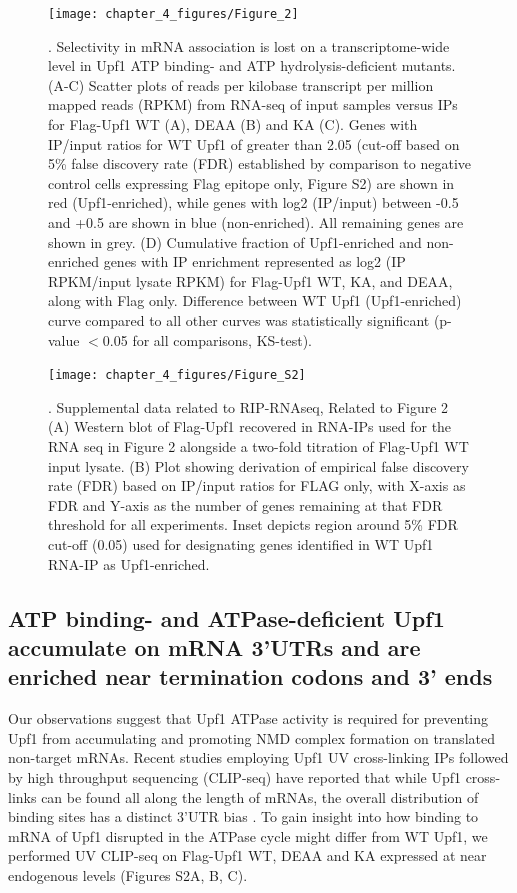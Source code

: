 \begin{figure}[ht]
  \centering
  \texttt{[image: chapter\_4\_figures/Figure\_2]}
  \caption[Figure 1]{. Selectivity in mRNA association is lost on a transcriptome-wide level in Upf1 ATP binding- and ATP hydrolysis-deficient mutants.
    (A-C) Scatter plots of reads per kilobase transcript per million mapped reads (RPKM) from RNA-seq of input samples versus IPs for Flag-Upf1 WT (A), DEAA (B) and KA (C). Genes with IP/input ratios for WT Upf1 of greater than 2.05 (cut-off based on 5\% false discovery rate (FDR) established by comparison to negative control cells expressing Flag epitope only, Figure S2) are shown in red (Upf1-enriched), while genes with log2 (IP/input) between -0.5 and +0.5 are shown in blue (non-enriched). All remaining genes are shown in grey. (D) Cumulative fraction of Upf1-enriched and non-enriched genes with IP enrichment represented as log2 (IP RPKM/input lysate RPKM) for Flag-Upf1 WT, KA, and DEAA, along with Flag only. Difference between WT Upf1 (Upf1-enriched) curve compared to all other curves was statistically significant (p-value $<$0.05 for all comparisons, KS-test). }
  \label{fig:Figure_1}
  \end{figure}

\begin{figure}[ht]
  \centering
  \texttt{[image: chapter\_4\_figures/Figure\_S2]}
  \caption[Supplementary Figure 1]{. Supplemental data related to RIP-RNAseq, Related to Figure 2
    (A) Western blot of Flag-Upf1 recovered in RNA-IPs used for the RNA seq in Figure 2 alongside a two-fold titration of Flag-Upf1 WT input lysate. (B) Plot showing derivation of empirical false discovery rate (FDR) based on IP/input ratios for FLAG only, with X-axis as FDR and Y-axis as the number of genes remaining at that FDR threshold for all experiments. Inset depicts region around 5\% FDR cut-off (0.05) used for designating genes identified in WT Upf1 RNA-IP as Upf1-enriched. }
  \label{fig:Figure_S1}
\end{figure}

\subsection{ATP binding- and ATPase-deficient Upf1 accumulate on mRNA 3’UTRs and are enriched near termination codons and 3’ ends}
Our observations suggest that Upf1 ATPase activity is required for preventing Upf1 from accumulating and promoting NMD complex formation on translated non-target mRNAs. Recent studies employing Upf1 UV cross-linking IPs followed by high throughput sequencing (CLIP-seq) have reported that while Upf1 cross-links can be found all along the length of mRNAs, the overall distribution of binding sites has a distinct 3’UTR bias \cite{Gregersen2014, Hurt2013, Zund2013}. To gain insight into how binding to mRNA of Upf1 disrupted in the ATPase cycle might differ from WT Upf1, we performed UV CLIP-seq on Flag-Upf1 WT, DEAA and KA expressed at near endogenous levels (Figures S2A, B, C).


